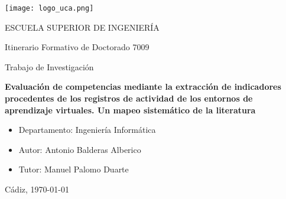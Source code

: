 

\begin{center}

  \texttt{[image: logo\_uca.png]} \\

  \vspace{2.0cm}

  \Large{ESCUELA SUPERIOR DE INGENIERÍA} \\

  \vspace{1.0cm}

  \large{Itinerario Formativo de Doctorado 7009} \\

  \vspace{2.0cm}

  \large{Trabajo de Investigación} \\

  \vspace{1.0cm}

  \Large{\textbf{Evaluación de competencias mediante la extracción de indicadores procedentes de los registros de actividad de los entornos de aprendizaje virtuales. Un mapeo sistemático de la literatura}} \\
    
  \vspace{3.0cm}

\end{center}

\begin{itemize}
\item \large{Departamento: Ingeniería Informática}
\item \large{Autor: Antonio Balderas Alberico}
\item \large{Tutor: Manuel Palomo Duarte}
\end{itemize}

\vspace{1.0cm}

\begin{flushright}
  \large{Cádiz, \today} \\

\end{flushright}
